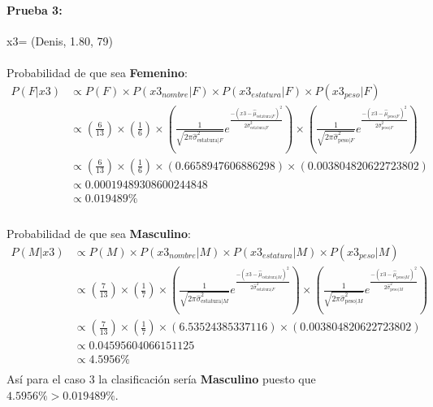 \documentclass[12pt]{article}
\begin{document}
 \paragraph{Prueba 3: }x3= (Denis, 1.80, 79)
 \paragraph{}Probabilidad de que sea \textbf{Femenino}:\\
 \begin{equation}
 \begin{split}
 P(F|x3) &\propto P(F) \times P(x3_{nombre}|F) \times P(x3_{estatura}|F) \times P(x3_{peso}|F) \\
 &\propto (\frac{6}{13}) \times (\frac{1}{6}) \times (\frac{1}{\sqrt{2\pi\hat{\sigma}_{\text{estatura}|F}^2}}e^{\frac{-(x3 - \hat{\mu}_{\text{estatura}|F})^2}{2\hat{\sigma}_{\text{estatura}|F}^2}}) \times (\frac{1}{\sqrt{2\pi\hat{\sigma}_{\text{peso}|F}^2}}e^{\frac{-(x3 - \hat{\mu}_{\text{peso}|F})^2}{2\hat{\sigma}_{\text{peso}|F}^2}}) \\
 &\propto (\frac{6}{13}) \times (\frac{1}{6}) \times (0.6658947606886298) \times (0.003804820622723802) \\
 &\propto 0.00019489308600244848 \\
 &\propto 0.019489\% \\
 \end{split}
 \end{equation}
 \paragraph{}Probabilidad de que sea \textbf{Masculino}:\\
 \begin{equation}
 \begin{split}
 P(M|x3) &\propto P(M) \times P(x3_{nombre}|M) \times P(x3_{estatura}|M) \times P(x3_{peso}|M) \\
 &\propto (\frac{7}{13}) \times (\frac{1}{7}) \times (\frac{1}{\sqrt{2\pi\hat{\sigma}_{\text{estatura}|M}^2}}e^{\frac{-(x3 - \hat{\mu}_{\text{estatura}|M})^2}{2\hat{\sigma}_{\text{estatura}|F}^2}}) \times (\frac{1}{\sqrt{2\pi\hat{\sigma}_{\text{peso}|M}^2}}e^{\frac{-(x3 - \hat{\mu}_{\text{peso}|M})^2}{2\hat{\sigma}_{\text{peso}|M}^2}}) \\
 &\propto (\frac{7}{13}) \times (\frac{1}{7}) \times (6.53524385337116) \times (0.003804820622723802) \\
 &\propto 0.04595604066151125 \\
 &\propto 4.5956 \% \\
 \end{split}
 \end{equation}
 Así para el caso 3 la clasificación sería \textbf{Masculino} puesto que $4.5956\% > 0.019489\%$.\\
\end{document}
